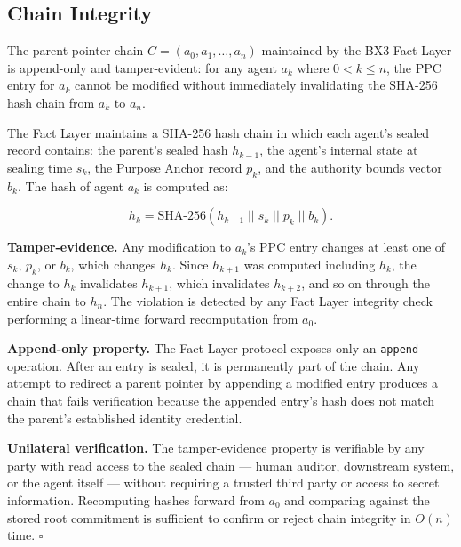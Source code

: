\subsection{Chain Integrity}

\begin{property} \label{prop:chain-integrity}
The parent pointer chain $C = (a_0, a_1, \ldots, a_n)$ maintained by the BX3 Fact Layer is append-only and tamper-evident: for any agent $a_k$ where $0 < k \leq n$, the PPC entry for $a_k$ cannot be modified without immediately invalidating the SHA-256 hash chain from $a_k$ to $a_n$.
\end{property}

\begin{Proof}
The Fact Layer maintains a SHA-256 hash chain in which each agent's sealed record contains: the parent's sealed hash $h_{k-1}$, the agent's internal state at sealing time $s_k$, the Purpose Anchor record $p_k$, and the authority bounds vector $b_k$. The hash of agent $a_k$ is computed as:

\begin{equation}
h_k = \mathrm{SHA\text{-}256}(h_{k-1} \;||\; s_k \;||\; p_k \;||\; b_k).
\label{eq:chain-hash-computation}
\end{equation}

\medskip
\noindent\textbf{Tamper-evidence.} Any modification to $a_k$'s PPC entry changes at least one of $s_k$, $p_k$, or $b_k$, which changes $h_k$. Since $h_{k+1}$ was computed including $h_k$, the change to $h_k$ invalidates $h_{k+1}$, which invalidates $h_{k+2}$, and so on through the entire chain to $h_n$. The violation is detected by any Fact Layer integrity check performing a linear-time forward recomputation from $a_0$.

\medskip
\noindent\textbf{Append-only property.} The Fact Layer protocol exposes only an \texttt{append} operation. After an entry is sealed, it is permanently part of the chain. Any attempt to redirect a parent pointer by appending a modified entry produces a chain that fails verification because the appended entry's hash does not match the parent's established identity credential.

\medskip
\noindent\textbf{Unilateral verification.} The tamper-evidence property is verifiable by any party with read access to the sealed chain --- human auditor, downstream system, or the agent itself --- without requiring a trusted third party or access to secret information. Recomputing hashes forward from $a_0$ and comparing against the stored root commitment is sufficient to confirm or reject chain integrity in $O(n)$ time. $\square$
\end{Proof}

